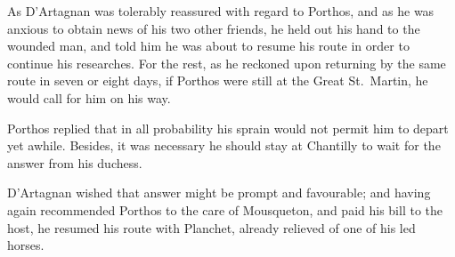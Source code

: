 As D'Artagnan was tolerably reassured with regard to Porthos, and as he was anxious to obtain news of his two other friends, he held out his hand to the wounded man, and told him he was about to resume his route in order to continue his researches. For the rest, as he reckoned upon returning by the same route in seven or eight days, if Porthos were still at the Great St.~Martin, he would call for him on his way. 

Porthos replied that in all probability his sprain would not permit him to depart yet awhile. Besides, it was necessary he should stay at Chantilly to wait for the answer from his duchess. 

D'Artagnan wished that answer might be prompt and favourable; and having again recommended Porthos to the care of Mousqueton, and paid his bill to the host, he resumed his route with Planchet, already relieved of one of his led horses.
